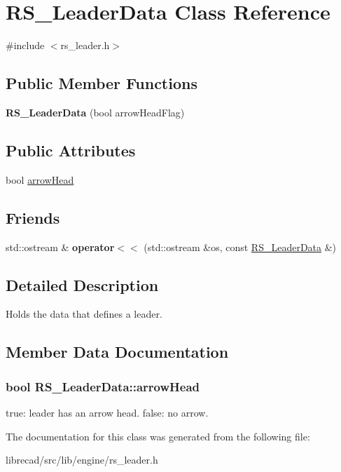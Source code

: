 \hypertarget{classRS__LeaderData}{\section{R\-S\-\_\-\-Leader\-Data Class Reference}
\label{classRS__LeaderData}
}


{\ttfamily \#include $<$rs\-\_\-leader.\-h$>$}

\subsection*{Public Member Functions}
\begin{DoxyCompactItemize}
\item 
\hypertarget{classRS__LeaderData_aa390750d896eff411d98d59ca3edde1c}{{\bfseries R\-S\-\_\-\-Leader\-Data} (bool arrow\-Head\-Flag)}\label{classRS__LeaderData_aa390750d896eff411d98d59ca3edde1c}

\end{DoxyCompactItemize}
\subsection*{Public Attributes}
\begin{DoxyCompactItemize}
\item 
bool \hyperlink{classRS__LeaderData_a179b62751329d97d3aaf88170fd58e11}{arrow\-Head}
\end{DoxyCompactItemize}
\subsection*{Friends}
\begin{DoxyCompactItemize}
\item 
\hypertarget{classRS__LeaderData_aa32fa6e7f7f3b6c04df665c11f9fc422}{std\-::ostream \& {\bfseries operator$<$$<$} (std\-::ostream \&os, const \hyperlink{classRS__LeaderData}{R\-S\-\_\-\-Leader\-Data} \&)}\label{classRS__LeaderData_aa32fa6e7f7f3b6c04df665c11f9fc422}

\end{DoxyCompactItemize}


\subsection{Detailed Description}
Holds the data that defines a leader. 

\subsection{Member Data Documentation}
\hypertarget{classRS__LeaderData_a179b62751329d97d3aaf88170fd58e11}{
\subsubsection[{arrow\-Head}]{\setlength{\rightskip}{0pt plus 5cm}bool R\-S\-\_\-\-Leader\-Data\-::arrow\-Head}}\label{classRS__LeaderData_a179b62751329d97d3aaf88170fd58e11}
true\-: leader has an arrow head. false\-: no arrow. 

The documentation for this class was generated from the following file\-:\begin{DoxyCompactItemize}
\item 
librecad/src/lib/engine/rs\-\_\-leader.\-h\end{DoxyCompactItemize}
